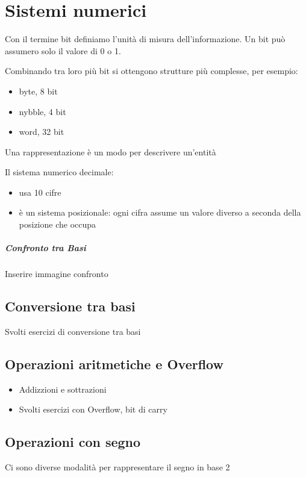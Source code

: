 \documentclass[12pt, a4paper, openany]{book}
\begin{document}
\chapter{Sistemi numerici} 

Con il termine bit definiamo l'unità di misura dell'informazione. Un bit può assumero solo il valore di 0 o 1.

Combinando tra loro più bit si ottengono strutture più complesse, per esempio:
\begin{itemize}
    \item byte, 8 bit
    \item nybble, 4 bit
    \item word, 32 bit
\end{itemize}

Una rappresentazione è un modo per descrivere un'entità

Il sistema numerico decimale:

\begin{itemize}
    \item usa 10 cifre
    \item è un sistema posizionale: ogni cifra assume un valore diverso a seconda della posizione che occupa
\end{itemize}

\paragraph{Confronto tra Basi}
Inserire immagine confronto

\section{Conversione tra basi}
Svolti esercizi di conversione tra basi
\section{Operazioni aritmetiche e Overflow}
\begin{itemize}
    \item Addizzioni e sottrazioni
    \item Svolti esercizi con Overflow, bit di carry
\end{itemize}

\section{Operazioni con segno}
Ci sono diverse modalità per rappresentare il segno in base 2
\end{document}

